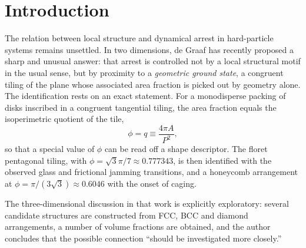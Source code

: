 \documentclass[aps,prl,twocolumn,superscriptaddress,floatfix]{revtex4-2}
\begin{document}
\begin{abstract}
transition-like slope change above $10.7\%$ at $\sqrt{3}\pi/7$ and $14.4\%$ at
the intermediate rung $k{=}4$ (kagome, $\phi=\sqrt{3}\pi/8$), robustly across
composition and system size, while the apparent dynamical arrest density shifts
with the observation-time criterion by $+0.041$ per decade. The ladder is
instead realised mechanically: seeded dilution confirms the zero-parameter
rigidity hierarchy set by the contact count $z=6-K$ against the Maxwell
threshold -- honeycomb floppy, kagome exactly isostatic and thermally marginal,
maple-leaf hyperstatic with a finite stability margin -- so the rung densities
are stability points of depleted solids rather than equilibrium attractors. In
three dimensions every rung of the ladder is hyperstatic.
\end{abstract}

\maketitle

\section{Introduction}

The relation between local structure and dynamical arrest in hard-particle
systems remains unsettled. In two dimensions, de Graaf has recently proposed a
sharp and unusual answer: that arrest is controlled not by a local structural
motif in the usual sense, but by proximity to a \emph{geometric ground state}, a
congruent tiling of the plane whose associated area fraction is picked out by
geometry alone. The identification rests on an exact statement. For a
monodisperse packing of disks inscribed in a congruent tangential tiling, the
area fraction equals the isoperimetric quotient of the tile,
\begin{equation}
\phi = q \equiv \frac{4\pi A}{P^2},
\label{eq:2d}
\end{equation}
so that a special value of $\phi$ can be read off a shape descriptor. The floret
pentagonal tiling, with $\phi=\sqrt{3}\pi/7\approx0.777343$, is then identified
with the observed glass and frictional jamming transitions, and a honeycomb
arrangement at $\phi=\pi/(3\sqrt{3})\approx0.6046$ with the onset of caging.

The three-dimensional discussion in that work is explicitly exploratory: several
candidate structures are constructed from FCC, BCC and diamond arrangements, a
number of volume fractions are obtained, and the author concludes that the
possible connection ``should be investigated more closely.''
\end{document}
